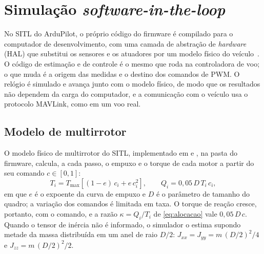 \section{Simulação \textit{software-in-the-loop}}
\label{sec:sitl}

No SITL do ArduPilot, o próprio código do firmware é compilado para o
computador de desenvolvimento, com uma camada de abstração de
\textit{hardware} (HAL) que substitui os sensores e os atuadores por um modelo
físico do veículo~\cite{ardupilotdev}. O código de estimação e de controle é
o mesmo que roda na controladora de voo; o que muda é a origem das medidas e
o destino dos comandos de PWM. O relógio é simulado e avança junto com o
modelo físico, de modo que os resultados não dependem da carga do computador,
e a comunicação com o veículo usa o protocolo MAVLink, como em um voo real.

\subsection{Modelo de multirrotor}

O modelo físico de multirrotor do SITL, implementado em
 e , na pasta
 do firmware, calcula, a cada passo, o empuxo e o
torque de cada motor a partir do seu comando $c \in [0, 1]$:
\begin{equation}
T_i = T_{\max}\left[(1-e)\,c_i + e\,c_i^2\right], \qquad
Q_i = 0{,}05\,D\,T_i\,c_i,
\label{eq:motor-sitl}
\end{equation}
em que $e$ é o expoente da curva de empuxo e $D$ é o parâmetro de tamanho do
quadro; a variação dos comandos é limitada em taxa. O torque de reação cresce,
portanto, com o comando, e a razão $\kappa = Q_i/T_i$ de
\eqref{eq:alocacao} vale $0{,}05\,D\,c$. Quando o tensor de inércia não é
informado, o simulador o estima supondo metade da massa distribuída em um anel
de raio $D/2$:
$J_{xx} = J_{yy} = m\,(D/2)^2/4$ e $J_{zz} = m\,(D/2)^2/2$.

